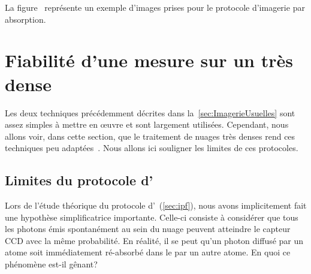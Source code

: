 \noindent
La figure~ représente un exemple d'images prises pour le protocole d'imagerie par absorption.
\bfighss
{}\,
\,
\label{fig:ImagesAbsor}
\efigh


\section{Fiabilité d'une mesure sur un \n très dense}\label{sec:LimitesNuageDense}
Les deux techniques précédemment décrites dans la~\autoref{sec:ImagerieUsuelles} sont assez simples à mettre en \oe uvre et sont largement utilisées. Cependant, nous allons voir, dans cette section, que le traitement de nuages très denses rend ces techniques peu adaptées~\cite{KDS99,KSN01}. Nous allons ici souligner les limites de ces protocoles.%


\subsection{Limites du protocole d'\ipf}
Lors de l'étude théorique du protocole d'\ipf~(\autoref{sec:ipf}), nous avons implicitement fait une hypothèse simplificatrice importante. Celle-ci consiste à considérer que tous les photons émis spontanément au sein du nuage peuvent atteindre le capteur CCD avec la même probabilité. 
%
En réalité, il se peut qu'un photon diffusé par un atome soit immédiatement ré-absorbé dans le \n par un autre atome.
\noindent En quoi ce phénomène est-il gênant?

